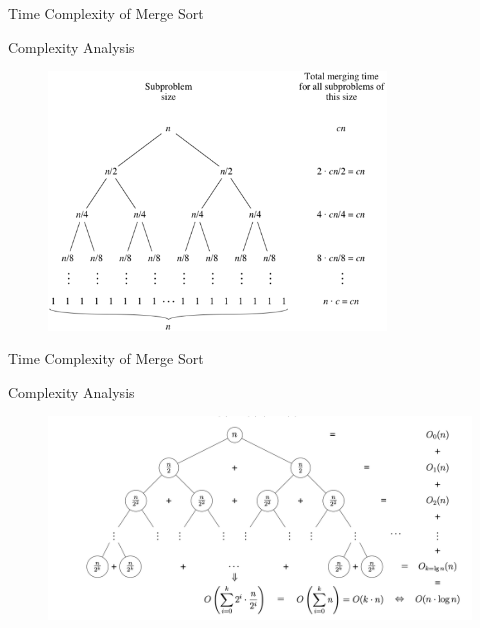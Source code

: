 \documentclass{beamer}
\begin{document}
\begin{frame}{Time Complexity of Merge Sort}
  \begin{block}{Complexity Analysis}
    \begin{figure}
      \centering
      \includegraphics[width=0.8\textwidth]{graphics/mergetree.png}
    \end{figure}
  \end{block}
\end{frame}
\begin{frame}{Time Complexity of Merge Sort}
  \begin{block}{Complexity Analysis}
    \begin{figure}
      \centering
      \includegraphics[width=1\textwidth]{graphics/mergetree_2.png}
    \end{figure}

  \end{block}
\end{frame}
\end{document}
